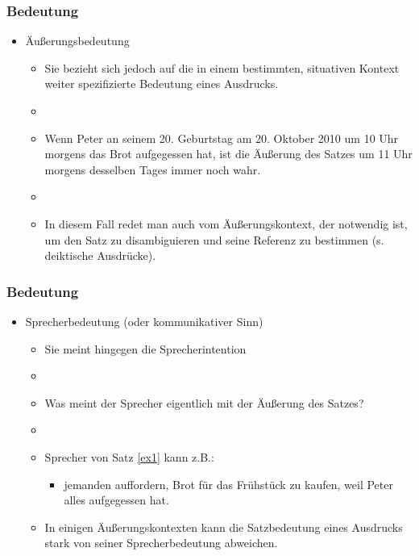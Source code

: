 
\begin{frame}
\frametitle{Bedeutung}

\begin{itemize}
	\item Äußerungsbedeutung
	
	\begin{itemize}
		\item Sie bezieht sich jedoch auf die in einem bestimmten, situativen Kontext weiter spezifizierte Bedeutung eines Ausdrucks.
		\item[]
		\item Wenn Peter an seinem 20. Geburtstag am 20. Oktober 2010 um 10 Uhr morgens das Brot aufgegessen hat, ist die Äußerung des Satzes um 11 Uhr morgens desselben Tages immer noch wahr.
		\item[]
		\item In diesem Fall redet man auch vom Äußerungskontext, der notwendig ist, um den Satz zu disambiguieren und seine Referenz zu bestimmen (s. deiktische Ausdrücke).
	\end{itemize}
	
\end{itemize}

\end{frame}



\begin{frame}
\frametitle{Bedeutung}

\begin{itemize}
	\item Sprecherbedeutung (oder kommunikativer Sinn)
	
	\begin{itemize}
		\item Sie meint hingegen die Sprecherintention
		\item[]
		\item Was meint der Sprecher eigentlich mit der Äußerung des Satzes?
		\item[]
		\item Sprecher von Satz \ref{ex1} kann z.B.:
		
		\begin{itemize}
			\item jemanden auffordern, Brot für das Frühstück zu kaufen, weil Peter alles aufgegessen hat.
		\end{itemize}
		
		\item In einigen Äußerungskontexten kann die Satzbedeutung eines Ausdrucks stark von seiner Sprecherbedeutung abweichen.
	\end{itemize}

\end{itemize}

\end{frame}


